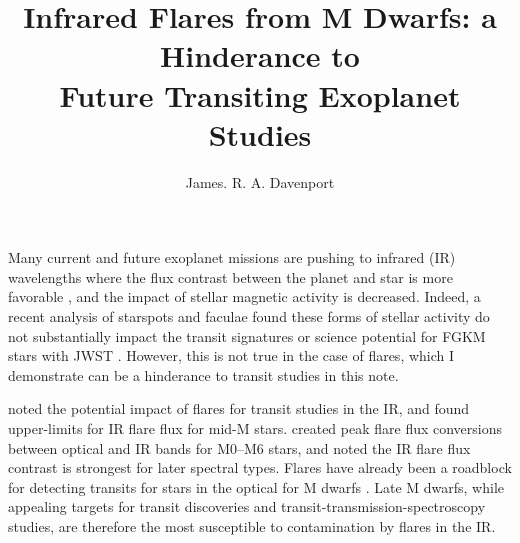 \documentclass[]{rnaastex}
\begin{document}
\title{Infrared Flares from M Dwarfs: a Hinderance to\\ Future Transiting Exoplanet Studies}


\author{James. R. A. Davenport}





\section{} 

Many current and future exoplanet missions are pushing to infrared (IR) wavelengths where the flux contrast between the planet and star is more favorable \citep{deming2009}, and the impact of stellar magnetic activity is decreased. Indeed, a recent analysis of starspots and faculae found these forms of stellar activity do not substantially impact the transit signatures or science potential for FGKM stars with JWST \citep{zellem2017}. However, this is not true in the case of flares, which I demonstrate can be a hinderance to transit studies in this note. 

\citet{tofflemire2012} noted the potential impact of flares for transit studies in the IR, and found upper-limits for IR flare flux for mid-M stars. \citet{davenport2012} created peak flare flux conversions between optical and IR bands for M0--M6 stars, and noted the IR flare flux contrast is strongest for later spectral types. Flares have already been a roadblock for detecting transits for stars in the optical for M dwarfs \citep[e.g. Proxima b:][]{davenport2016a, kipping2017}. Late M dwarfs, while appealing targets for transit discoveries and transit-transmission-spectroscopy studies, are therefore the most susceptible to contamination by flares in the IR.
\end{document}
